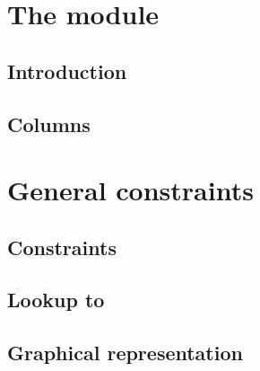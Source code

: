 \section{The \hashInfoMod{} module}
%
\subsection{Introduction}                         \label{hash info: introduction}      
\subsection{Columns}                              \label{hash info: columns}           
%
\section{General constraints}
\subsection{Constraints}                          \label{hash info: constraints}       
\subsection{Lookup to \hashDataMod{}}             \label{hash info: lookup}            
\subsection{Graphical representation}             \label{hash info: representation}    
